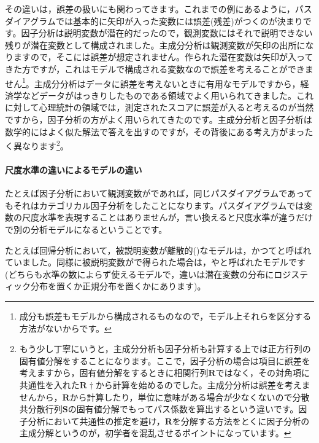 \documentclass{ltjsbook}
\begin{document}
その違いは，誤差の扱いにも関わってきます。これまでの例にあるように，パスダイアグラムでは基本的に矢印が入った変数には誤差(残差)がつくのが決まりです。因子分析は説明変数が潜在的だったので，観測変数にはそれで説明できない残りが潜在変数として構成されました。主成分分析は観測変数が矢印の出所になりますので，そこには誤差が想定されません。作られた潜在変数は矢印が入ってきた方ですが，これはモデルで構成される変数なので誤差を考えることができません\footnote{成分も誤差もモデルから構成されるものなので，モデル上それらを区分する方法がないからです。}。主成分分析はデータに誤差を考えないときに有用なモデルですから，経済学などデータがはっきりしたものである領域でよく用いられてきました。これに対して心理統計の領域では，測定されたスコアに誤差が入ると考えるのが当然ですから，因子分析の方がよく用いられてきたのです。主成分分析と因子分析は数学的にはよく似た解法で答えを出すのですが，その背後にある考え方がまったく異なります\footnote{もう少し丁寧にいうと，主成分分析も因子分析も計算する上では正方行列の固有値分解をすることになります。ここで，因子分析の場合は項目に誤差を考えますから，固有値分解をするときに相関行列$\bm{R}$ではなく，その対角項に共通性を入れた$\bm{R}\dagger$から計算を始めるのでした。主成分分析は誤差を考えませんから，$\bm{R}$から計算したり，単位に意味がある場合が少なくないので分散共分散行列$\bm{S}$の固有値分解でもってパス係数を算出するという違いです。因子分析において共通性の推定を避け，$\bm{R}$を分解する方法をとくに因子分析の主成分解というのが，初学者を混乱させるポイントになっています。}。

\paragraph{尺度水準の違いによるモデルの違い}

たとえば因子分析において観測変数がであれば，同じパスダイアグラムであってもそれはカテゴリカル因子分析をしたことになります。パスダイアグラムでは変数の尺度水準を表現することはありませんが，言い換えると尺度水準が違うだけで別の分析モデルになるということです。

たとえば回帰分析において，被説明変数が離散的()なモデルは，かつてと呼ばれていました。同様に被説明変数がで得られた場合は，やと呼ばれたモデルです(どちらも水準の数によらず使えるモデルで，違いは潜在変数の分布にロジスティック分布を置くか正規分布を置くかにあります)。
\end{document}
